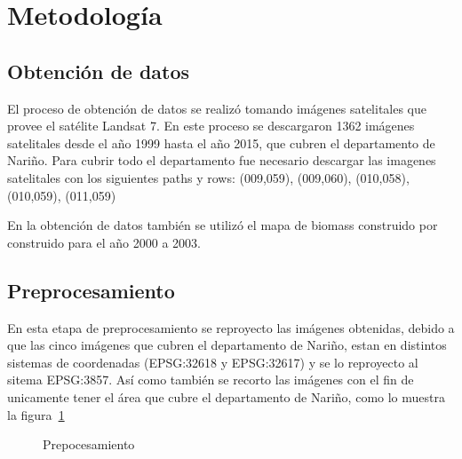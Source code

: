  
\section{Metodología}

\subsection{Obtención de datos}

El proceso de obtención de datos se realizó tomando imágenes satelitales que provee el satélite
Landsat 7. En este proceso se descargaron 1362 imágenes satelitales desde el año 1999 hasta el año 2015, que cubren el 
departamento de Nariño. Para cubrir todo el departamento fue necesario descargar las imagenes satelitales con 
los siguientes paths y rows: (009,059), (009,060), (010,058), (010,059), (011,059) 

En la obtención de datos también se utilizó el mapa de biomass construido por \cite{baccini2012estimated} 
construido para el año 2000 a 2003.


\subsection{Preprocesamiento}

En esta etapa de preprocesamiento se reproyecto las imágenes obtenidas, debido a que las cinco imágenes
que cubren el departamento de Nariño, estan en distintos sistemas de coordenadas (EPSG:32618 y EPSG:32617) y se 
lo reproyecto al sitema EPSG:3857. Así como también se recorto las imágenes con el fin de unicamente tener 
el área que cubre el departamento de Nariño, como lo muestra la figura~\ref{fig:Recortar imágenes}

\begin{figure}
  \centering
  \vfill
  \caption{Prepocesamiento}
  \label{fig:Recortar imágenes}
\end{figure}

